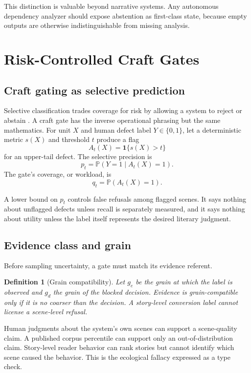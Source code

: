 \documentclass[11pt]{article}
\newtheorem{definition}{Definition}[section]
\newcommand{\Prob}{\mathbb{P}}
\newcommand{\ind}{\mathbf{1}}
\begin{document}
This distinction is valuable beyond narrative systems. Any autonomous dependency analyzer
should expose abstention as first-class state, because empty outputs are otherwise
indistinguishable from missing analysis.

\section{Risk-Controlled Craft Gates}
\label{sec:statistics}

\subsection{Craft gating as selective prediction}

Selective classification trades coverage for risk by allowing a system to reject or abstain
\cite{elyaniv2010selective}. A craft gate has the inverse operational phrasing but the same
mathematics. For unit $X$ and human defect label $Y\in\{0,1\}$, let a deterministic metric
$s(X)$ and threshold $t$ produce a flag
\[
 A_t(X)=\ind\{s(X)>t\}
\]
for an upper-tail defect. The selective precision is
\[
 p_t=\Prob(Y=1\mid A_t(X)=1).
\]
The gate's coverage, or workload, is
\[
 q_t=\Prob(A_t(X)=1).
\]

A lower bound on $p_t$ controls false refusals among flagged scenes. It says nothing about
unflagged defects unless recall is separately measured, and it says nothing about utility
unless the label itself represents the desired literary judgment.

\subsection{Evidence class and grain}

Before sampling uncertainty, a gate must match its evidence referent.

\begin{definition}[Grain compatibility]
Let $g_e$ be the grain at which the label is observed and $g_d$ the grain of the blocked
decision. Evidence is grain-compatible only if it is no coarser than the decision. A
story-level conversion label cannot license a scene-level refusal.
\end{definition}

Human judgments about the system's own scenes can support a scene-quality claim. A published
corpus percentile can support only an out-of-distribution claim. Story-level reader behavior
can rank stories but cannot identify which scene caused the behavior. This is the ecological
fallacy expressed as a type check.
\end{document}
